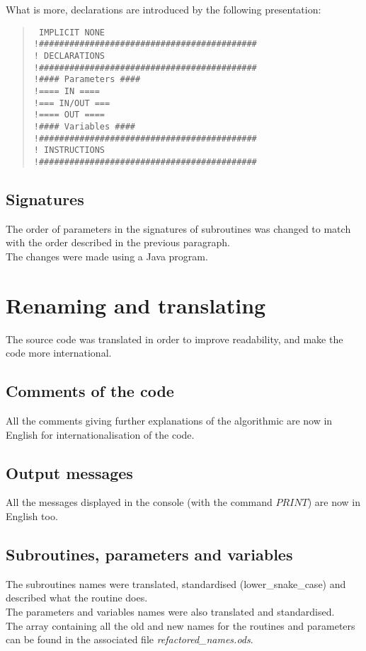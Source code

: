 \newpage
What is more, declarations are introduced by the following presentation: 
\begin{quote}
\texttt{
IMPLICIT NONE \\
!\#\#\#\#\#\#\#\#\#\#\#\#\#\#\#\#\#\#\#\#\#\#\#\#\#\#\#\#\#\#\#\#\#\#\#\#\#\#\#\#\#\#\# \\
! DECLARATIONS \\
!\#\#\#\#\#\#\#\#\#\#\#\#\#\#\#\#\#\#\#\#\#\#\#\#\#\#\#\#\#\#\#\#\#\#\#\#\#\#\#\#\#\#\# \\
!\#\#\#\# Parameters \#\#\#\# \\
!==== IN ==== \\
!=== IN/OUT === \\
!==== OUT ==== \\
!\#\#\#\# Variables \#\#\#\# \\
!\#\#\#\#\#\#\#\#\#\#\#\#\#\#\#\#\#\#\#\#\#\#\#\#\#\#\#\#\#\#\#\#\#\#\#\#\#\#\#\#\#\#\# \\
! INSTRUCTIONS \\
!\#\#\#\#\#\#\#\#\#\#\#\#\#\#\#\#\#\#\#\#\#\#\#\#\#\#\#\#\#\#\#\#\#\#\#\#\#\#\#\#\#\#\#  \\
}
\end{quote}

\subsection{Signatures}
The order of parameters in the signatures of subroutines was changed to match with the order described in the previous paragraph.
\\The changes were made using a Java program.


\section{Renaming and translating}
The source code was translated in order to improve readability, and make the code more international.

\subsection{Comments of the code}
All the comments giving further explanations of the algorithmic are now in English for internationalisation of the code.

\subsection{Output messages}
All the messages displayed in the console (with the command $PRINT$) are now in English too.

\subsection{Subroutines, parameters and variables}
The subroutines names were translated, standardised (lower\_snake\_case) and described what the routine does.
\\ The parameters and variables names were also translated and standardised.
\\ The array containing all the old and new names for the routines and parameters can be found in the associated file \textit{refactored\_names.ods}.
